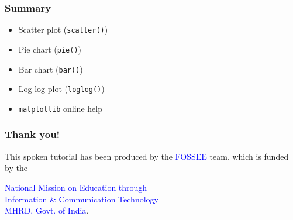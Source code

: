 \documentclass[presentation]{beamer}
\begin{document}
\begin{frame}
\frametitle{Summary}
\label{sec-17}

\begin{itemize}
\item Scatter plot (\texttt{scatter()})
\item Pie chart (\texttt{pie()})
\item Bar chart (\texttt{bar()})
\item Log-log plot (\texttt{loglog()})
\item \texttt{matplotlib} online help
\end{itemize}
\end{frame}
\begin{frame}
\frametitle{Thank you!}
\label{sec-18}

  \begin{block}{}
  \begin{center}
  This spoken tutorial has been produced by the
  \textcolor{blue}{FOSSEE} team, which is funded by the 
  \end{center}
  \begin{center}
    \textcolor{blue}{National Mission on Education through \\
      Information \& Communication Technology \\ 
      MHRD, Govt. of India}.
  \end{center}  
  \end{block}
\end{frame}
\end{document}
